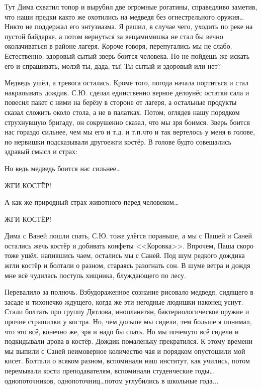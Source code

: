 Тут Дима схватил топор и вырубил две огромные рогатины, справедливо заметив, что наши предки как\sdash то же охотились на медведя без огнестрельного оружия\ldots  Никто не поддержал его энтузиазма. Я решил, в случае чего, уходить по реке на пустой байдарке, а потом вернуться за вещами\mdash мишка не стал бы вечно околачиваться в районе лагеря. Короче говоря, перепугались мы не слабо. Естественно, здоровый сытый зверь боится человека. Но не пойдешь же искать его и спрашивать, мол\mdash эй ты, да\sdash да, ты! Ты сытый и здоровый или нет? 

Медведь ушёл, а тревога осталась. Кроме того, погода начала портиться и стал накрапывать дождик. С.Ю. сделал единственно верное дело\mdash унёс остатки сала и повесил пакет с ними на берёзу в стороне от лагеря, а остальные продукты сказал сложить около стола, а не в палатках. Потом, оглядев нашу порядком струхнувшую бригаду, он сокрушенно сказал, что мы зря боимся. Зверь боится нас гораздо сильнее, чем мы его и т.д. и т.п.\mdash что и так вертелось у меня в голове, но нервишки подсказывали другое\mdash жги костёр. В голове будто совещались здравый смысл и страх:

\ndash  Но ведь медведь боится нас сильнее\ldots  

\ndash  ЖГИ КОСТЁР! 

\ndash  А как же природный страх животного перед человеком\ldots  

\ndash  Ж\sdash Г\sdash И   К\sdash О\sdash С\sdash Т\sdash Ё\sdash Р!

Дима с Ваней пошли спать, С.Ю. тоже улёгся пораньше, а мы с Пашей и Саней остались жечь костёр и добивать конфеты <<Коровка>>. Впрочем, Паша скоро тоже ушёл, напившись чаем, остались мы с Саней. Под шум редкого дождика жгли костёр и болтали о разном, стараясь разогнать сон. В шуме ветра и дождя мне всё чудилась поступь хищника, блуждающего по лесу. 

Перевалило за полночь. Взбудораженное сознание рисовало медведя, сидящего в засаде и тихонечко ждущего, когда же эти негодные людишки наконец уснут. Стали болтать про группу Дятлова, инопланетян, бактериологическое оружие и прочие страшилки у костра. Но, чем дольше мы сидели, тем больше я понимал, что это всё, конечно же, зря и надо бы спать. Но мы почему\sdash то всё сидели и подкидывали дрова в костёр. Дождик помаленьку прекратился. К этому времени мы выпили с Саней неимоверное количество чая и порядком опустошили мой кисет. Болтали о всяком разном, вспоминали наш институт, как учились, потом перемывали кости преподавателям, вспоминали студенческие годы\ldots однопоточников, однопоточниц\ldots потом углубились в школьные года$\ldots$

